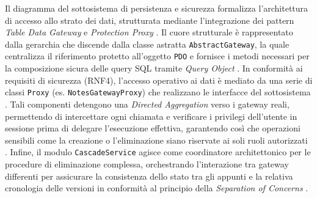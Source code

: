 Il diagramma del sottosistema di persistenza e sicurezza formalizza l'architettura di accesso allo strato dei dati, strutturata mediante l'integrazione dei pattern \textit{Table Data Gateway} e \textit{Protection Proxy} \cite{689, 1370, 1381}. Il cuore strutturale è rappresentato dalla gerarchia che discende dalla classe astratta \texttt{AbstractGateway}, la quale centralizza il riferimento protetto all'oggetto \texttt{PDO} e fornisce i metodi necessari per la composizione sicura delle query SQL tramite \textit{Query Object} \cite{1403, 1422, 2158}. In conformità ai requisiti di sicurezza (RNF4), l'accesso operativo ai dati è mediato da una serie di classi \texttt{Proxy} (es. \texttt{NotesGatewayProxy}) che realizzano le interfacce del sottosistema \cite{1307, 2169, 2171}. Tali componenti detengono una \textit{Directed Aggregation} verso i gateway reali, permettendo di intercettare ogni chiamata e verificare i privilegi dell'utente in sessione prima di delegare l'esecuzione effettiva, garantendo così che operazioni sensibili come la creazione o l'eliminazione siano riservate ai soli ruoli autorizzati \cite{1616, 2165, 2170}. Infine, il modulo \texttt{CascadeService} agisce come coordinatore architettonico per le procedure di eliminazione complessa, orchestrando l'interazione tra gateway differenti per assicurare la consistenza dello stato tra gli appunti e la relativa cronologia delle versioni in conformità al principio della \textit{Separation of Concerns} \cite{2176, 2178, 2179}.




